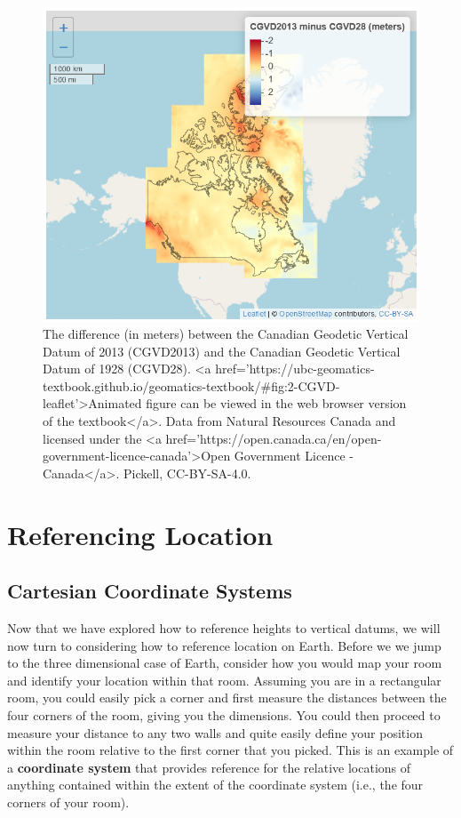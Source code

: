 \documentclass[
]{book}
\begin{document}
\begin{figure}
\includegraphics[width=1\linewidth]{images/02-CGVD-leaflet} \caption{The difference (in meters) between the Canadian Geodetic Vertical Datum of 2013 (CGVD2013) and the Canadian Geodetic Vertical Datum of 1928 (CGVD28). <a
  href='https://ubc-geomatics-textbook.github.io/geomatics-textbook/#fig:2-CGVD-leaflet'>Animated figure can be viewed in the web browser version of the textbook</a>. Data from Natural Resources Canada and licensed under the <a href='https://open.canada.ca/en/open-government-licence-canada'>Open Government Licence - Canada</a>. Pickell, CC-BY-SA-4.0.}\label{fig:2-CGVD-leaflet}
\end{figure}

\section{Referencing Location}\label{referencing-location}

\subsection{Cartesian Coordinate Systems}\label{cartesian-coordinate-systems}

Now that we have explored how to reference heights to vertical datums, we will now turn to considering how to reference location on Earth. Before we we jump to the three dimensional case of Earth, consider how you would map your room and identify your location within that room. Assuming you are in a rectangular room, you could easily pick a corner and first measure the distances between the four corners of the room, giving you the dimensions. You could then proceed to measure your distance to any two walls and quite easily define your position within the room relative to the first corner that you picked. This is an example of a \textbf{coordinate system} that provides reference for the relative locations of anything contained within the extent of the coordinate system (i.e., the four corners of your room).
\end{document}
